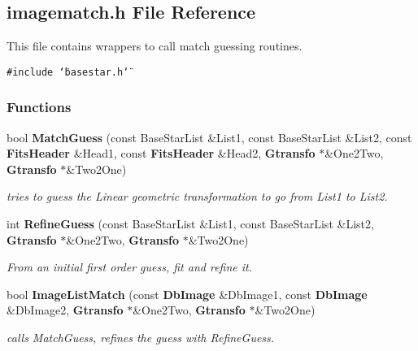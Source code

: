 \subsection{imagematch.h File Reference}
\label{imagematch_h}
This file contains wrappers to call match guessing routines. 


{\tt \#include \char`\"{}basestar.h\char`\"{}}\par
\subsubsection*{Functions}
\begin{CompactItemize}
\item 
bool {\bf Match\-Guess} (const Base\-Star\-List \&List1, const Base\-Star\-List \&List2, const {\bf Fits\-Header} \&Head1, const {\bf Fits\-Header} \&Head2, {\bf Gtransfo} $\ast$\&One2Two, {\bf Gtransfo} $\ast$\&Two2One)
\begin{CompactList}\small\item\em tries to guess the Linear geometric transformation to go from List1 to List2.\item\end{CompactList}\item 
{}
int {\bf Refine\-Guess} (const Base\-Star\-List \&List1, const Base\-Star\-List \&List2, {\bf Gtransfo} $\ast$\&One2Two, {\bf Gtransfo} $\ast$\&Two2One)\label{imagematch_h_a1}

\begin{CompactList}\small\item\em From an initial first order guess, fit and refine it.\item\end{CompactList}\item 
{}
bool {\bf Image\-List\-Match} (const {\bf Db\-Image} \&Db\-Image1, const {\bf Db\-Image} \&Db\-Image2, {\bf Gtransfo} $\ast$\&One2Two, {\bf Gtransfo} $\ast$\&Two2One)\label{imagematch_h_a2}

\begin{CompactList}\small\item\em calls Match\-Guess, refines the guess with Refine\-Guess.\item\end{CompactList}\end{CompactItemize}


